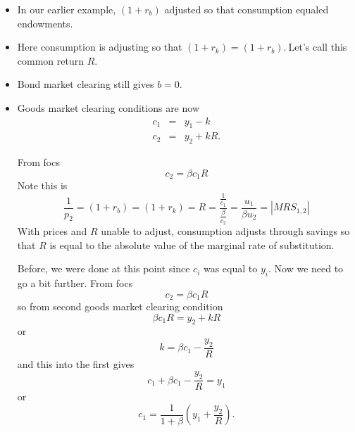 \documentclass{sebase}
\begin{document}
\begin{itemize}
\item In our earlier example, $\left( 1+r_{b}\right) $ adjusted so that
consumption equaled endowments.

\item Here consumption is adjusting so that $\left( 1+r_{k}\right) =\left(
1+r_{b}\right) .\ $Let's call this common return $R$.

\item Bond market clearing still gives $b=0.$

\item Goods market clearing conditions are now 
\begin{eqnarray*}
c_{1} &=&y_{1}-k \\
c_{2} &=&y_{2}+kR.
\end{eqnarray*}%
\pagebreak

From focs 
\begin{equation*}
c_{2}=\beta c_{1}R
\end{equation*}%
Note this is 
\begin{equation*}
\frac{1}{p_{2}}=\left( 1+r_{b}\right) =\left( 1+r_{k}\right) =R=\frac{\frac{1%
}{c_{1}}}{\frac{\beta }{c_{2}}}=\frac{u_{1}}{\beta u_{2}}=\left\vert
MRS_{1,2}\right\vert
\end{equation*}%
With prices and $R$ unable to adjust, consumption adjusts through savings so
that $R$ is equal to the absolute value of the marginal rate of
substitution. \pagebreak

Before, we were done at this point since $c_{i}$ was equal to $y_{i}$. Now
we need to go a bit further. From focs 
\begin{equation*}
c_{2}=\beta c_{1}R
\end{equation*}%
so from second goods market clearing condition%
\begin{equation*}
\beta c_{1}R=y_{2}+kR
\end{equation*}%
or 
\begin{equation*}
k=\beta c_{1}-\frac{y_{2}}{R}
\end{equation*}%
and this into the first gives 
\begin{equation*}
c_{1}+\beta c_{1}-\frac{y_{2}}{R}=y_{1}
\end{equation*}%
or 
\begin{equation*}
c_{1}=\frac{1}{1+\beta }\left( y_{1}+\frac{y_{2}}{R}\right) .
\end{equation*}%
\pagebreak
\end{itemize}
\end{document}
